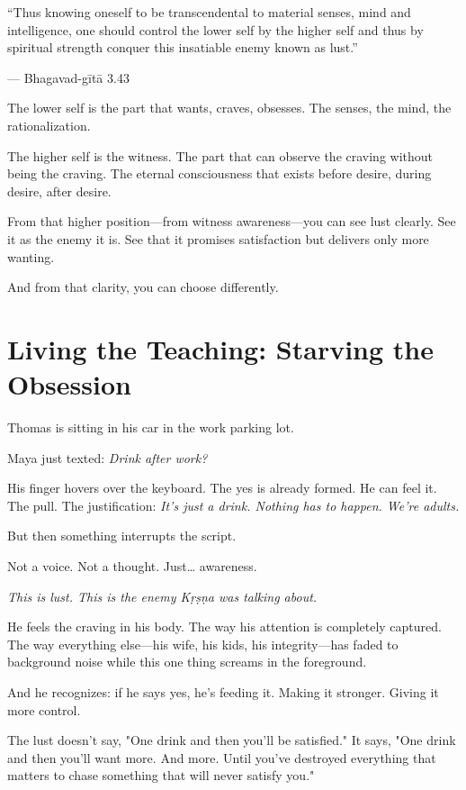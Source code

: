 \documentclass[11pt,twoside]{book}
\begin{document}
\begin{pullquote}
``Thus knowing oneself to be transcendental to material senses, mind and intelligence, one should control the lower self by the higher self and thus by spiritual strength conquer this insatiable enemy known as lust.''

--- Bhagavad-gītā 3.43
\end{pullquote}

The lower self is the part that wants, craves, obsesses. The senses, the mind, the rationalization.

The higher self is the witness. The part that can observe the craving without being the craving. The eternal consciousness that exists before desire, during desire, after desire.

From that higher position—from witness awareness—you can see lust clearly. See it as the enemy it is. See that it promises satisfaction but delivers only more wanting.

And from that clarity, you can choose differently.

\section*{Living the Teaching: Starving the Obsession}

Thomas is sitting in his car in the work parking lot.

Maya just texted: \emph{Drink after work?}

His finger hovers over the keyboard. The yes is already formed. He can feel it. The pull. The justification: \emph{It's just a drink. Nothing has to happen. We're adults.}

But then something interrupts the script.

Not a voice. Not a thought. Just\ldots{} awareness.

\emph{This is lust. This is the enemy Kṛṣṇa was talking about.}

He feels the craving in his body. The way his attention is completely captured. The way everything else—his wife, his kids, his integrity—has faded to background noise while this one thing screams in the foreground.

And he recognizes: if he says yes, he's feeding it. Making it stronger. Giving it more control.

The lust doesn't say, "One drink and then you'll be satisfied." It says, "One drink and then you'll want more. And more. Until you've destroyed everything that matters to chase something that will never satisfy you."
\end{document}
